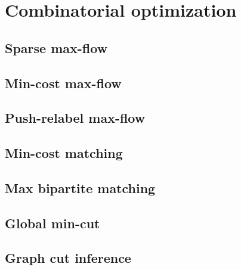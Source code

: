 \section{Combinatorial optimization}
\subsection{Sparse max-flow}
\raggedbottom
\subsection{Min-cost max-flow}
\raggedbottom
\subsection{Push-relabel max-flow}
\raggedbottom
\subsection{Min-cost matching}
\raggedbottom
\subsection{Max bipartite matching}
\raggedbottom
\subsection{Global min-cut}
\raggedbottom
\subsection{Graph cut inference}
\raggedbottom

